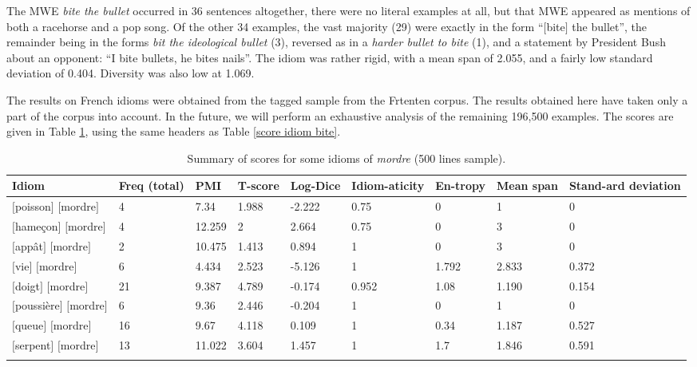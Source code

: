 \documentclass[output=paper]{langsci/langscibook}
\begin{document}
The MWE \textit{bite the bullet} occurred in 36 sentences altogether, there
were no literal examples at all, but that MWE appeared as mentions of
both a racehorse and a pop song. Of the other 34 examples, the vast
majority (29) were exactly in the form “$[$bite$]$ the bullet”, the
remainder being in the forms \textit{bit the ideological bullet} (3), reversed
as in a \textit{harder bullet to bite} (1), and a statement by President Bush
about an opponent: “I bite bullets, he bites nails”. The idiom was
rather rigid, with a mean span of 2.055, and a fairly low standard
deviation of 0.404. Diversity was also low at 1.069. 



The results on French idioms were obtained from the tagged sample from
the Frtenten corpus. The results obtained here have taken only a part
of the corpus into account. In the future, we will perform an
exhaustive analysis of the remaining 196,500 examples. The scores are
given in Table \ref{score idiom mordre}, using the same headers as Table \ref{score idiom bite}.



\begin{table}[H]
\small
\begin{tabular}{p{1.7cm} p{0.7cm}p{0.7cm}p{0.8cm}p{0.85cm}p{1cm}p{0.85cm}p{0.85cm}p{0.9cm}}
\lsptoprule
Idiom &
Freq (total) &
PMI &
T-score &
Log-Dice &
Idiom-aticity &
En-tropy &
Mean span &
Stand-ard deviation\\
\midrule
$[$poisson$]$ $[$mordre$]$ &
4 &
7.34 &
1.988 &
\mbox{-2.222} &
0.75 &
0 &
1 &
0\\
$[$hameçon$]$ $[$mordre$]$ &
4 &
12.259 &
2 &
2.664 &
0.75 &
0 &
3 &
0\\
$[$appât$]$ $[$mordre$]$ &
2 &
10.475 &
1.413 &
0.894 &
1 &
0 &
3 &
0\\
$[$vie$]$ $[$mordre$]$ &
6 &
4.434 &
2.523 &
-5.126 &
1 &
1.792 &
2.833 &
0.372\\
$[$doigt$]$ $[$mordre$]$ &
21 &
9.387 &
4.789 &
-0.174 &
0.952 &
1.08 &
1.190 &
0.154\\
$[$poussière$]$ $[$mordre$]$ &
6 &
9.36 &
2.446 &
\mbox{-0.204} &
1 &
0 &
1 &
0\\
$[$queue$]$ $[$mordre$]$ &
16 &
9.67 &
4.118 &
0.109 &
1 &
0.34 &
1.187 &
0.527\\
$[$serpent$]$ $[$mordre$]$ &
13 &
11.022 &
3.604 &
1.457 &
1 &
1.7 &
1.846 &
0.591\\
\lspbottomrule
\end{tabular}
\caption{Summary of scores for some idioms of \textit{mordre} (500 lines sample).}
\label{score idiom mordre}
\end{table}
\end{document}
